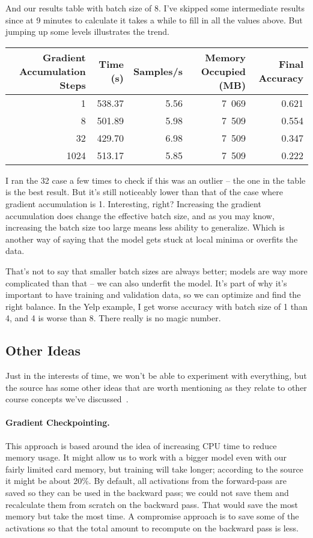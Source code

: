 And our results table with batch size of 8. I've skipped some intermediate results since at 9 minutes to calculate it takes a while to fill in all the values above. But jumping up some levels illustrates the trend.

\begin{center}
\begin{tabular}{r|r|r|r|r}
\textbf{Gradient Accumulation Steps} & \textbf{Time (s)} & \textbf{Samples/s} & \textbf{Memory Occupied (MB)} & Final Accuracy\\ \hline
1 & 538.37 & 5.56 & 7~069 & 0.621 \\
8 & 501.89 & 5.98 & 7~509 & 0.554 \\
32 & 429.70 & 6.98 & 7~509 & 0.347 \\
1024 & 513.17 & 5.85 & 7~509 & 0.222 \\
\end{tabular}
\end{center}

I ran the 32 case a few times to check if this was an outlier -- the one in the table is the best result. But it's still noticeably lower than that of the case where gradient accumulation is 1. Interesting, right? Increasing the gradient accumulation does change the effective batch size, and as you may know, increasing the batch size too large means less ability to generalize. Which is another way of saying that the model gets stuck at local minima or overfits the data.

That's not to say that smaller batch sizes are always better; models are way more complicated than that -- we can also underfit the model. It's part of why it's important to have training and validation data, so we can optimize and find the right balance. In the Yelp example, I get worse accuracy with batch size of 1 than 4, and 4 is worse than 8. There really is no magic number.

\subsection*{Other Ideas}
Just in the interests of time, we won't be able to experiment with everything, but the source has some other ideas that are worth mentioning as they relate to other course concepts we've discussed~\cite{hf}.

\paragraph{Gradient Checkpointing.} This approach is based around the idea of increasing CPU time to reduce memory usage. It might allow us to work with a bigger model even with our fairly limited card memory, but training will take longer; according to the source it might be about 20\%. By default, all activations from the forward-pass are saved so they can be used in the backward pass; we could not save them and recalculate them from scratch on the backward pass. That would save the most memory but take the most time. A compromise approach is to save some of the activations so that the total amount to recompute on the backward pass is less. 

